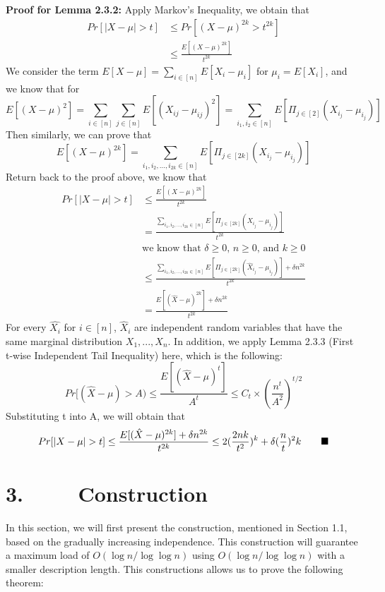\documentclass[a4paper, english]{paper}
\begin{document}
	
	 \noindent\textbf{Proof for Lemma 2.3.2:} Apply Markov's Inequality, we obtain that
	 \begin{align*}
	 	Pr\left[|X - \mu| > t\right]  &\le Pr\left[\left(X - \mu\right)^{2k} > t^{2k}\right]\\
	 	& \le \frac{E[(X-\mu)^{2k}]}{t^{2k}}
	\end{align*}
	We consider the term $E[X-\mu]=\sum_{i\in[n]} E[X_i - \mu_i]$ for $\mu_i = E[X_i]$, and we know that for 
	$$E[(X-\mu)^2] = \sum_{i \in [n]} \sum_{j \in [n]} E[(X_{ij} - \mu_{ij})^2]=\sum_{i_1, i_2 \in [n]} E[\Pi_{j \in [2]}(X_{i_j}-\mu_{i_j})]$$
	Then similarly, we can prove that 
	$$E[(X-\mu)^{2k}] = \sum_{i_1, i_2, ..., i_{2k} \in [n]} E[\Pi_{j \in [2k]}(X_{i_j}-\mu_{i_j})]$$
	Return back to the proof above, we know that 
	\begin{align*}
	 	Pr\left[|X - \mu| > t\right]  & \le \frac{E[(X-\mu)^{2k}]}{t^{2k}} \\
		&= \frac{\sum_{i_1, i_2, ..., i_{2k} \in [n]} E[\Pi_{j \in [2k]}(X_{i_j}-\mu_{i_j})]}{t^{2k}} \\
		& \text{we know that $\delta \ge 0$, $n \ge 0$, and $k \ge 0$} \\
		& \le \frac{\sum_{i_1, i_2, ..., i_{2k} \in [n]} E[\Pi_{j \in [2k]}(\hat{X}_{i_j}-\mu_{i_j})] + \delta n^{2k}}{t^{2k}} \\
		& = \frac{E[(\hat{X}-\mu)^{2k}] + \delta n^{2k}}{t^{2k}}
	 \end{align*}
	 For every $\hat{X_i}$ for $i \in [n]$, $\hat{X}_i$ are independent random variables that have the same marginal distribution $X_1, ..., X_n$. In addition, we apply Lemma 2.3.3 (First t-wise Independent Tail Inequality) here, which is the following: 
	 $$ Pr[(\hat{X}-\mu) > A) \le \frac{E[(\hat{X}-\mu)^t]}{A^t} \le C_t \times (\frac{n^t}{A^2})^{t/2} $$ 
	 Substituting t into A, we will obtain that
	 $$ Pr[|X - \mu| > t] \le \frac{E[(\hat{X}-\mu)^{2k}] + \delta n^{2k}}{t^{2k}} \le 2(\frac{2nk}{t^2})^k + \delta (\frac{n}{t})^2k \qquad \hfill\blacksquare$$ 
		
	\section{3. $\qquad$ Construction}
\quad	In this section, we will first present the construction, mentioned in Section 1.1, based on the gradually increasing independence. This construction will guarantee a maximum load of  $O(\log n/\log\log n)$ using $O(\log n/\log\log n)$ with a smaller description length. This constructions allows us to prove the following theorem: \\
	
\end{document}
